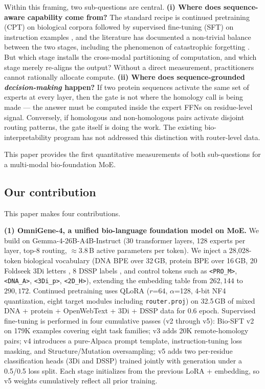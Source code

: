 \documentclass[11pt]{article}
\begin{document}
Within this framing, two sub-questions are central. \textbf{(i) Where does sequence-aware capability come from?} The standard recipe is continued pretraining (CPT) on biological corpora followed by supervised fine-tuning (SFT) on instruction examples \citep{ibrahim2024cpt, jindal2024balance, jiang2024instruction}, and the literature has documented a non-trivial balance between the two stages, including the phenomenon of catastrophic forgetting \citep{luo2023forgetting, huang2024sssr}. But which stage installs the cross-modal partitioning of computation, and which stage merely re-aligns the output? Without a direct measurement, practitioners cannot rationally allocate compute. \textbf{(ii) Where does sequence-grounded \emph{decision-making} happen?} If two protein sequences activate the same set of experts at every layer, then the gate is not where the homology call is being made --- the answer must be computed inside the expert FFNs on residue-level signal. Conversely, if homologous and non-homologous pairs activate disjoint routing patterns, the gate itself is doing the work. The existing bio-interpretability program \citep{adams2025scfminterp, templeton2024scaling, bricken2023monosemanticity, cai2024moesurvey} has not addressed this distinction with router-level data.

This paper provides the first quantitative measurements of both sub-questions for a multi-modal bio-foundation MoE.

\subsection*{Our contribution}

This paper makes four contributions.

\textbf{(1) OmniGene-4, a unified bio-language foundation model on MoE.} We build on Gemma-4-26B-A4B-Instruct \citep{gemmateam2025} (30 transformer layers, 128 experts per layer, top-8 routing, $\approx 3.8$\,B active parameters per token). We inject a 28{,}028-token biological vocabulary (DNA BPE over 32\,GB, protein BPE over 16\,GB, 20 Foldseek 3Di letters \citep{vankempen2024foldseek}, 8 DSSP labels \citep{kabsch1983dssp}, and control tokens such as \texttt{<PRO\_M>}, \texttt{<DNA\_A>}, \texttt{<3Di\_p>}, \texttt{<2D\_H>}), extending the embedding table from $262{,}144$ to $290{,}172$. Continued pretraining uses QLoRA \citep{dettmers2023qlora, hu2022lora} ($r$=64, $\alpha$=128, 4-bit NF4 quantization, eight target modules including \texttt{router.proj}) on 32.5\,GB of mixed DNA + protein + OpenWebText + 3Di + DSSP data for 0.6 epoch. Supervised fine-tuning is performed in four cumulative passes (v2 through v5): Bio-SFT v2 on 179K examples covering eight task families; v3 adds 20K remote-homology pairs; v4 introduces a pure-Alpaca prompt template, instruction-tuning loss masking, and Structure/Mutation oversampling; v5 adds two per-residue classification heads (3Di and DSSP) trained jointly with generation under a 0.5/0.5 loss split. Each stage initializes from the previous LoRA + embedding, so v5 weights cumulatively reflect all prior training.
\end{document}
